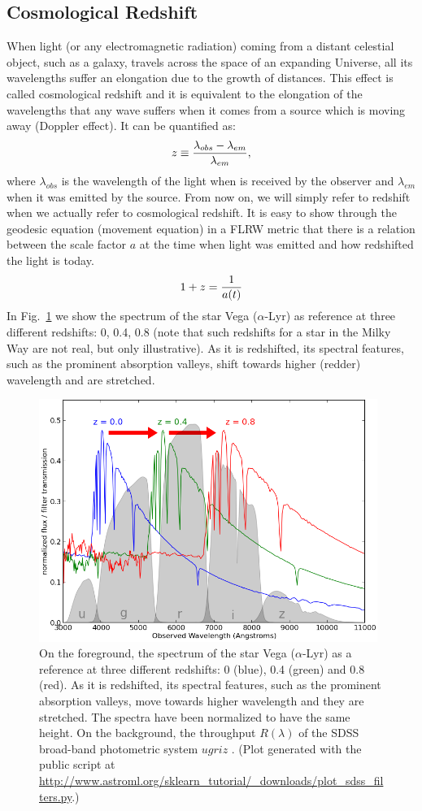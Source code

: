 \subsection{Cosmological Redshift}
When light (or any electromagnetic radiation) coming from a distant celestial object, such as a galaxy, travels across the space of an expanding Universe, all its wavelengths suffer an elongation due to the growth of distances. This effect is called cosmological redshift and it is equivalent to the elongation of the wavelengths that any wave suffers when it comes from a source which is moving away (Doppler effect). It can be quantified as: 
\begin{equation}
z \equiv {\lambda_{obs} - \lambda_{em} \over \lambda_{em}},
\label{redshift}
\end{equation} 
where $\lambda_{obs}$ is the wavelength of the light when is received by the observer and $\lambda_{em}$ when it was emitted by the source. From now on, we will simply refer to redshift when we actually refer to cosmological redshift. It is easy to show through the geodesic equation (movement equation) in a FLRW metric that there is a relation between the scale factor $a$ at the time when light was emitted and how redshifted the light is today. 
\begin{equation}
1 + z = {1 \over a(t)}
\label{z2a}
\end{equation} 
In Fig.~\ref{fig:sdss_filt} we show the spectrum of the star Vega ($\alpha$-Lyr) as reference at three different redshifts: 0, 0.4, 0.8 (note that such redshifts for a star in the Milky Way are not real, but only illustrative). As it is redshifted, its spectral features, such as the prominent absorption valleys, shift towards higher (redder) wavelength and are stretched.
\begin{figure}
\centering
\includegraphics[width=110mm]{./plots/plot_sdss_filters.png}
\caption{On the foreground, the spectrum of the star Vega ($\alpha$-Lyr) as a reference at three different redshifts: 0 (blue), 0.4 (green) and 0.8 (red). As it is redshifted, its spectral features, such as the prominent absorption valleys, move towards higher wavelength and they are stretched. The spectra have been normalized to have the same height. On the background, the throughput $R(\lambda)$ of the SDSS broad-band photometric system $ugriz$ \citep{Fukugita1996}. (Plot generated with the public script at \url{http://www.astroml.org/sklearn_tutorial/_downloads/plot_sdss_filters.py}.)}
\label{fig:sdss_filt}
\end{figure}

